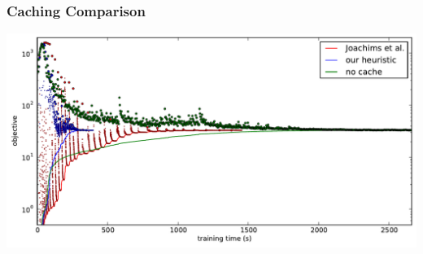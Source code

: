 \documentclass[final,ignorenonframetext,compress]{beamer}
\begin{document}
\begin{frame}
    \frametitle{Caching Comparison}
    \begin{center}
        \includegraphics[width=.9\linewidth]{images/caching}
    \end{center}
\end{frame}
\end{document}
